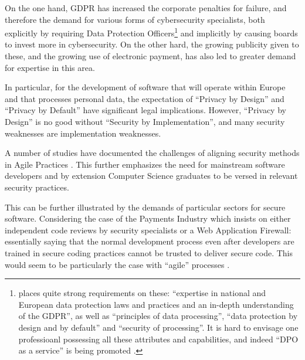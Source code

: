 \documentclass[conference]{IEEEtran}
\begin{document}
On the one hand, GDPR has increased the corporate penalties for failure, and therefore the demand for various forms of cybersecurity specialists, both explicitly by requiring Data Protection Officers\footnote{\cite{EU292016a} places quite strong requirements on these: ``expertise in national and European data protection laws and practices and an in-depth understanding of the GDPR'', as well as ``principles of data processing'', ``data protection by design and by default'' and ``security of processing''. It is hard to envisage one professioanl possessing all these attributes and capabilities, and indeed ``DPO as a service'' is being promoted \cite{McCreanor2018d}.} and implicitly by causing boards to invest more in cybersecurity. On the other hard, the growing publicity given to these, and the growing use of electronic payment, has also led to greater demand for expertise in this area.

In particular, for the development of software that will operate within Europe and that processes personal data, the expectation of ``Privacy by Design'' and ``Privacy by Default'' have significant legal implications. However, ``Privacy by Design'' is no good without ``Security by Implementation'', and many security weaknesses are implementation weaknesses.

A number of studies have documented the challenges of aligning security methods in Agile Practices \cite{vanderHeijden:2018:EPS:3239235.3267426}. This further emphasizes the need for mainstream software developers and by extension Computer Science graduates to be versed in relevant security practices.

This can be further illustrated by the demands of particular sectors for secure software. Considering the case of the Payments Industry \cite[6.6]{PCI2018b} which insists on either independent code reviews by security specialists or a Web Application Firewall: essentially saying that the normal development process even after developers are trained in secure coding practices \cite[6.5]{PCI2018b} cannot be trusted to deliver secure code. This would seem to be particularly the case with ``agile'' processes \cite{Bartsch2011a}.
\end{document}
